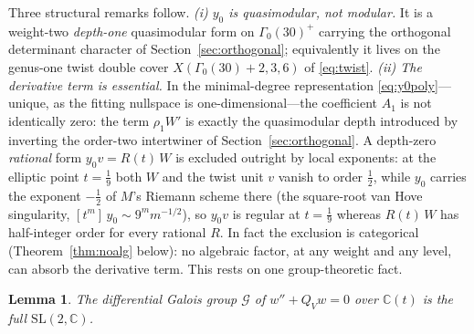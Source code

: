 \documentclass[11pt]{article}
\theoremstyle{plain}
\newtheorem{lem}[thm]{Lemma}
\theoremstyle{remark}
\begin{document}
Three structural remarks follow. \emph{(i) $y_0$ is quasimodular, not modular.} It is a
weight-two \emph{depth-one} quasimodular form on $\Gamma_0(30)^+$ carrying the orthogonal
determinant character of Section~\ref{sec:orthogonal}; equivalently it lives on the genus-one twist
double cover $X(\Gamma_0(30){+}2,3,6)$ of \eqref{eq:twist}. \emph{(ii) The derivative term is
essential.} In the minimal-degree representation \eqref{eq:y0poly}---unique, as the fitting
nullspace is one-dimensional---the coefficient $A_1$ is not identically zero: the term
$\rho_1W'$ is exactly the quasimodular depth introduced by inverting the order-two intertwiner
of Section~\ref{sec:orthogonal}. A depth-zero \emph{rational} form $y_0v=R(t)\,W$ is excluded
outright by local exponents: at the elliptic point $t=\tfrac19$ both $W$ and the twist unit $v$
vanish to order $\tfrac12$, while $y_0$ carries the exponent $-\tfrac12$ of $M$'s Riemann scheme
there (the square-root van Hove singularity, $[t^m]\,y_0\sim9^m m^{-1/2}$), so $y_0v$ is regular
at $t=\tfrac19$ whereas $R(t)\,W$ has half-integer order for every rational $R$. In fact the exclusion is categorical
(Theorem~\ref{thm:noalg} below): no
algebraic factor, at any weight and any level, can absorb the derivative term. This rests on
one group-theoretic fact.

\begin{lem}\label{lem:sl2}
The differential Galois group $\mathcal{G}$ of $w''+Q_Vw=0$ over
$\mathbb{C}(t)$ is the full $\mathrm{SL}(2,\mathbb{C})$.
\end{lem}
\end{document}
